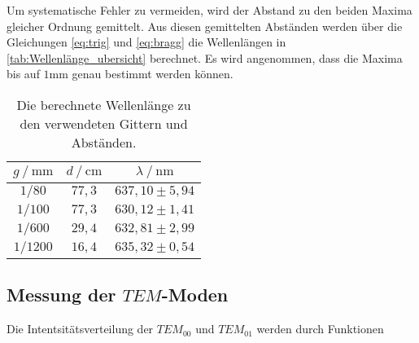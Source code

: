 Um systematische Fehler zu vermeiden, wird der Abstand zu den beiden Maxima gleicher Ordnung gemittelt. 
Aus diesen gemittelten Abständen werden über die Gleichungen \eqref{eq:trig} und \eqref{eq:bragg} die Wellenlängen in \autoref{tab:Wellenlänge_ubersicht} berechnet. 
Es wird angenommen, dass die Maxima bis auf $1 \unit{\milli\meter}$ genau bestimmt werden können.

\begin{table}[H]
    \centering
    \caption{Die berechnete Wellenlänge zu den verwendeten Gittern und Abständen.}
    \label{tab:Wellenlänge_ubersicht}
    \begin{tabular}{c c c}
    \toprule
     $g \mathbin{/} \unit{\milli\meter}$ & $d \mathbin{/} \unit{\centi\meter}$ &$\lambda \mathbin{/} \unit{\nano\meter}$ \\
    \midrule
    $1/80  $   & $77,3$   & $637,10 \pm 5,94$\\
    $1/100 $   & $77,3$   & $630,12 \pm 1,41$\\
    $1/600 $   & $29,4$   & $632,81 \pm 2,99$\\
    $1/1200$   & $16,4$   & $635,32 \pm 0,54$\\
    \bottomrule
    \end{tabular}
    \end{table}

\subsection{Messung der $TEM$-Moden}
\label{sec:TEM_moden}

Die Intentsitätsverteilung der $TEM_{00}$ und $TEM_{01}$  werden durch Funktionen 

